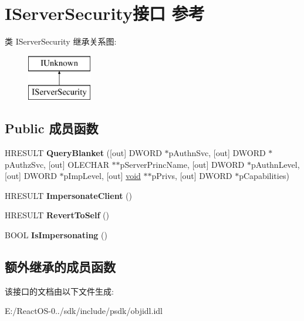 \hypertarget{interface_i_server_security}{}\section{I\+Server\+Security接口 参考}
\label{interface_i_server_security}
类 I\+Server\+Security 继承关系图\+:\begin{figure}[H]
\begin{center}
\leavevmode
\includegraphics[height=2.000000cm]{interface_i_server_security}
\end{center}
\end{figure}
\subsection*{Public 成员函数}
\begin{DoxyCompactItemize}
\item 
\mbox{\label{interface_i_server_security_a91f91e8d53824b9e21d05ea3850122a6}} 
H\+R\+E\+S\+U\+LT {\bfseries Query\+Blanket} (\mbox{[}out\mbox{]} D\+W\+O\+RD $\ast$p\+Authn\+Svc, \mbox{[}out\mbox{]} D\+W\+O\+RD $\ast$p\+Authz\+Svc, \mbox{[}out\mbox{]} O\+L\+E\+C\+H\+AR $\ast$$\ast$p\+Server\+Princ\+Name, \mbox{[}out\mbox{]} D\+W\+O\+RD $\ast$p\+Authn\+Level, \mbox{[}out\mbox{]} D\+W\+O\+RD $\ast$p\+Imp\+Level, \mbox{[}out\mbox{]} \hyperlink{interfacevoid}{void} $\ast$$\ast$p\+Privs, \mbox{[}out\mbox{]} D\+W\+O\+RD $\ast$p\+Capabilities)
\item 
\mbox{\label{interface_i_server_security_a6365ccdfa91393f6b46ad163dbab9ed4}} 
H\+R\+E\+S\+U\+LT {\bfseries Impersonate\+Client} ()
\item 
\mbox{\label{interface_i_server_security_a2784267f796877dfe711276e616979c4}} 
H\+R\+E\+S\+U\+LT {\bfseries Revert\+To\+Self} ()
\item 
\mbox{\label{interface_i_server_security_aa38d715ffd7b33bbe732be8d4ec6e384}} 
B\+O\+OL {\bfseries Is\+Impersonating} ()
\end{DoxyCompactItemize}
\subsection*{额外继承的成员函数}


该接口的文档由以下文件生成\+:\begin{DoxyCompactItemize}
\item 
E\+:/\+React\+O\+S-\/0../sdk/include/psdk/objidl.\+idl\end{DoxyCompactItemize}
